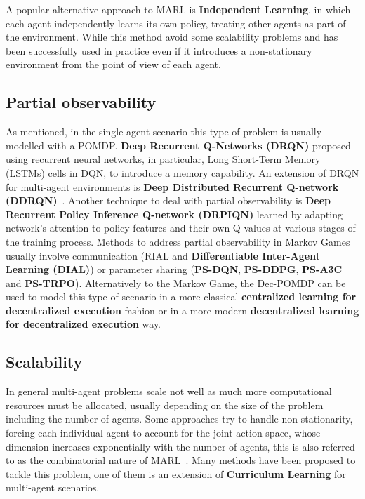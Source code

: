 \documentclass[11pt, a4paper, hidelinks]{report}
\begin{document}
A popular alternative approach to MARL is \textbf{Independent Learning}, in which each agent independently learns its own policy, treating other agents as part of the environment.
While this method avoid some scalability problems and has been successfully used in practice even if it introduces a non-stationary environment from the point of view of each agent.

\subsection{Partial observability}\label{subsec:partial-observability}

As mentioned, in the single-agent scenario this type of problem is usually modelled with a POMDP\@.
\textbf{Deep Recurrent Q-Networks (DRQN)} proposed using recurrent neural networks, in particular, Long Short-Term Memory (LSTMs) cells in DQN, to introduce a memory capability.
An extension of DRQN for multi-agent environments is \textbf{Deep Distributed Recurrent Q-network (DDRQN)}~\citep{Nguyen-2020}.
Another technique to deal with partial observability is \textbf{Deep Recurrent Policy Inference Q-network (DRPIQN)} learned by adapting network’s attention to policy features and their own Q-values at various stages of the training process.
Methods to address partial observability in Markov Games usually involve communication (RIAL and \textbf{Differentiable Inter-Agent Learning (DIAL)}) or parameter sharing (\textbf{PS-DQN}, \textbf{PS-DDPG}, \textbf{PS-A3C} and \textbf{PS-TRPO}).
Alternatively to the Markov Game, the Dec-POMDP can be used to model this type of scenario in a more classical \textbf{centralized learning for decentralized execution} fashion or in a more modern \textbf{decentralized learning for decentralized execution} way.

\subsection{Scalability}\label{subsec:scalability}

In general multi-agent problems scale not well as much more computational resources must be allocated, usually depending on the size of the problem including the number of agents.
Some approaches try to handle non-stationarity, forcing each individual agent to account for the joint action space, whose dimension increases exponentially with the number of agents, this is  also referred to as the combinatorial nature of MARL\@~\citep{zhang2019multiagent}.
Many methods have been proposed to tackle this problem, one of them is an extension of \textbf{Curriculum Learning} for multi-agent scenarios.
\end{document}
